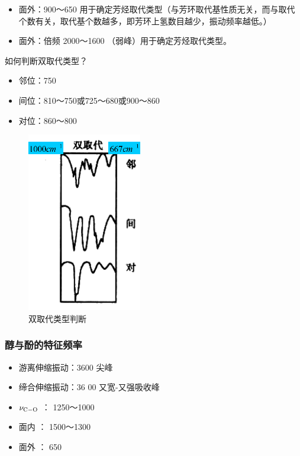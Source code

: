 \begin{itemize}
\begin{itemize}
        \item 面外：900～650  用于确定芳烃取代类型（与芳环取代基性质无关，而与取代个数有关，取代基个数越多，即芳环上氢数目越少，振动频率越低。）
        \item 面外：倍频 2000～1600 （弱峰）用于确定芳烃取代类型。
    \end{itemize}
	\begin{note}
		如何判断双取代类型？ 
		\begin{itemize}
			\item 邻位：750     
			\item 间位：810～750或725～680或900～860
			\item 对位：860～800
		\end{itemize}
		\begin{figure}[ht]
			\centering
			\includegraphics[width=5cm]{image/chp5_double.png}
			\caption{双取代类型判断}
			\label{fig:double}
		\end{figure}
    \end{note}
\end{itemize}

\subsubsection*{醇与酚的特征频率}
\begin{itemize}          
    \item 游离伸缩振动：3600      尖峰     
    \item 缔合伸缩振动：36 00     又宽-又强吸收峰
    \item $\nu_{\ce{C-O}}$          ： 1250～1000   
    \item 面内       ：   1500～1300  
    \item 面外      ： 650 
\end{itemize}

